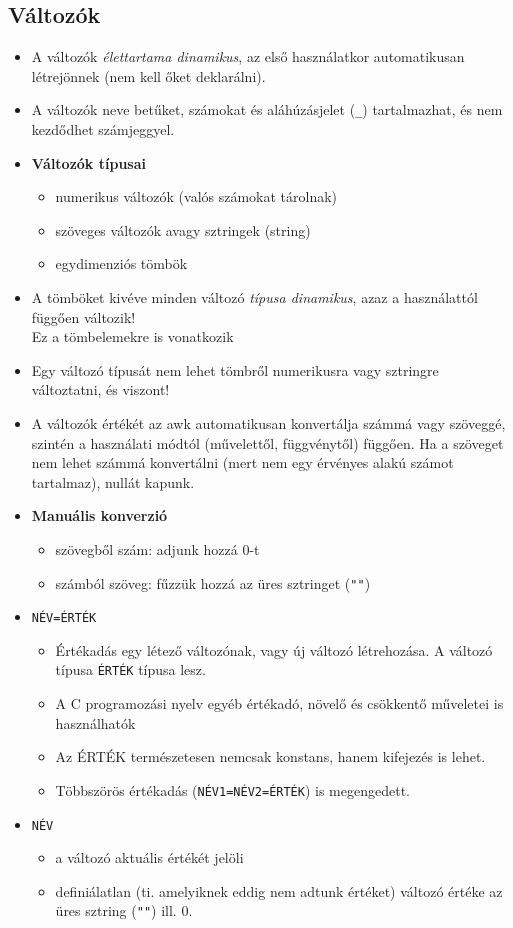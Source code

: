 \subsection{Változók}
\begin{itemize}
\item A változók \emph{élettartama dinamikus}, az első használatkor automatikusan létrejönnek (nem kell őket deklarálni).
\item A változók neve betűket, számokat és aláhúzásjelet (\verb._.) tartalmazhat, és nem kezdődhet számjeggyel.
\item \textbf{Változók típusai}
	\begin{itemize}
	\item  numerikus változók (valós számokat tárolnak)
	\item  szöveges változók avagy sztringek (string)
	\item  egydimenziós tömbök 	
	\end{itemize}

\item A tömböket kivéve minden változó \emph{típusa dinamikus}, azaz a használattól függően változik! \\
	Ez a tömbelemekre is vonatkozik 

\item Egy változó típusát nem lehet tömbről numerikusra vagy sztringre változtatni, és viszont!
\item A változók értékét az awk automatikusan konvertálja számmá vagy szöveggé, szintén a használati módtól 
(művelettől, függvénytől) függően. Ha a szöveget nem lehet számmá konvertálni 
(mert nem egy érvényes alakú számot tartalmaz), nullát kapunk.

\item \textbf{Manuális konverzió}\hfill
	\begin{itemize}
	\item szövegből szám: adjunk hozzá 0-t
	\item számból szöveg: fűzzük hozzá az üres sztringet (\verb."".)
	\end{itemize}
		
\item \texttt{NÉV=ÉRTÉK}\hfill
	\begin{itemize}
	\item Értékadás egy létező változónak, vagy új változó létrehozása. A változó típusa \texttt{ÉRTÉK} típusa lesz.
	\item A C programozási nyelv egyéb értékadó, növelő és csökkentő műveletei is használhatók
	\item Az ÉRTÉK természetesen nemcsak konstans, hanem kifejezés is lehet.
	\item Többszörös értékadás (\texttt{NÉV1=NÉV2=ÉRTÉK}) is megengedett.
	\end{itemize}
\item \texttt{NÉV}\hfill
	\begin{itemize}
	\item a változó aktuális értékét jelöli
	\item definiálatlan (ti. amelyiknek eddig nem adtunk értéket) változó értéke az üres sztring (\verb."".) ill. 0.
	\end{itemize}
\end{itemize}

